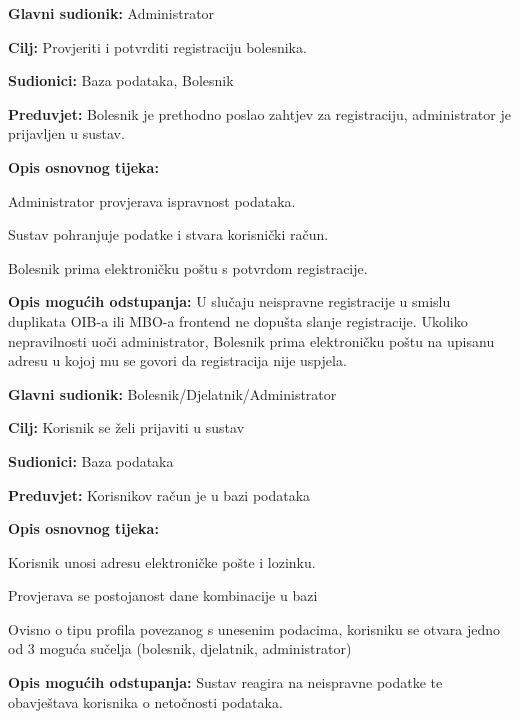 	\item \textbf{Glavni sudionik:} Administrator
	\item \textbf{Cilj:} Provjeriti i potvrditi registraciju bolesnika.
	\item \textbf{Sudionici:} Baza podataka, Bolesnik
	\item \textbf{Preduvjet:} Bolesnik je prethodno poslao zahtjev za registraciju, administrator je prijavljen u sustav.
	\item \textbf{Opis osnovnog tijeka:}
	\begin{packed_enum}
		\item Administrator provjerava ispravnost podataka.
		\item Sustav pohranjuje podatke i stvara korisnički račun.
  		\item Bolesnik prima elektroničku poštu s potvrdom registracije.
	\end{packed_enum}
	\item \textbf{Opis mogućih odstupanja:}
	U slučaju neispravne registracije u smislu duplikata OIB-a ili MBO-a frontend ne dopušta slanje registracije. 
    	Ukoliko nepravilnosti uoči administrator, Bolesnik prima elektroničku poštu na upisanu adresu u kojoj mu se govori da registracija nije uspjela.
\closeusecase


	\item \textbf{Glavni sudionik:} Bolesnik/Djelatnik/Administrator
	\item \textbf{Cilj:} Korisnik se želi prijaviti u sustav 
	\item \textbf{Sudionici:} Baza podataka
	\item \textbf{Preduvjet:} Korisnikov račun je u bazi podataka
	\item \textbf{Opis osnovnog tijeka:}
	\begin{packed_enum}
		\item Korisnik unosi adresu elektroničke pošte i lozinku.
		\item Provjerava se postojanost dane kombinacije u bazi
		\item Ovisno o tipu profila povezanog s unesenim podacima, korisniku se otvara jedno od 3 moguća sučelja (bolesnik, djelatnik, administrator)
	\end{packed_enum}
	\item \textbf{Opis mogućih odstupanja:}
	Sustav reagira na neispravne podatke te obavještava korisnika o netočnosti podataka. \\
\closeusecase


